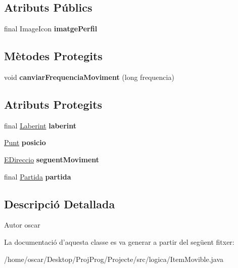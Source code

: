 \subsection*{Atributs Públics}
\begin{DoxyCompactItemize}
\item 
\hypertarget{classlogica_1_1_item_movible_a156a60365745803d0d3298b83aeacb73}{final Image\+Icon {\bfseries imatge\+Perfil}}\label{classlogica_1_1_item_movible_a156a60365745803d0d3298b83aeacb73}

\end{DoxyCompactItemize}
\subsection*{Mètodes Protegits}
\begin{DoxyCompactItemize}
\item 
\hypertarget{classlogica_1_1_item_movible_aa2ac3969ef87a7ebdee67878fd3a9547}{void {\bfseries canviar\+Frequencia\+Moviment} (long frequencia)}\label{classlogica_1_1_item_movible_aa2ac3969ef87a7ebdee67878fd3a9547}

\end{DoxyCompactItemize}
\subsection*{Atributs Protegits}
\begin{DoxyCompactItemize}
\item 
\hypertarget{classlogica_1_1_item_movible_a97036130b7376d77776427ca126f6fb5}{final \hyperlink{classlogica_1_1laberints_1_1_laberint}{Laberint} {\bfseries laberint}}\label{classlogica_1_1_item_movible_a97036130b7376d77776427ca126f6fb5}

\item 
\hypertarget{classlogica_1_1_item_movible_a9380636109f2180b48ee96e64de319a4}{\hyperlink{classlogica_1_1_punt}{Punt} {\bfseries posicio}}\label{classlogica_1_1_item_movible_a9380636109f2180b48ee96e64de319a4}

\item 
\hypertarget{classlogica_1_1_item_movible_a6e7ab9e5b0e363972a753e6b1550e7fb}{\hyperlink{enumlogica_1_1enumeracions_1_1_e_direccio}{E\+Direccio} {\bfseries seguent\+Moviment}}\label{classlogica_1_1_item_movible_a6e7ab9e5b0e363972a753e6b1550e7fb}

\item 
\hypertarget{classlogica_1_1_item_movible_ace55b4918a7f671f89ed3109c91359e4}{final \hyperlink{classlogica_1_1_partida}{Partida} {\bfseries partida}}\label{classlogica_1_1_item_movible_ace55b4918a7f671f89ed3109c91359e4}

\end{DoxyCompactItemize}


\subsection{Descripció Detallada}
\begin{DoxyAuthor}{Autor}
oscar 
\end{DoxyAuthor}


La documentació d'aquesta classe es va generar a partir del següent fitxer\+:\begin{DoxyCompactItemize}
\item 
/home/oscar/\+Desktop/\+Proj\+Prog/\+Projecte/src/logica/Item\+Movible.\+java\end{DoxyCompactItemize}
